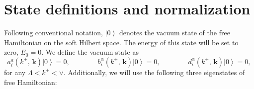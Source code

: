 \documentclass[10pt]{article}
\numberwithin{equation}{section}
\begin{document}
\section{State definitions and normalization}\label{sec:defn}
Following conventional notation, $\left|0\right\rangle$ denotes the vacuum state of the free Hamiltonian on the soft Hilbert space.
The energy of this state will be set to zero, $E_{0}=0$. 
We define the vacuum state as 
\begin{equation}
 a_{i}^{a}(k^{+},\, \mathbf{k})\left|0\right\rangle =0,\qquad\qquad b_{i}^{\alpha}(k^{+},\, \mathbf{k})\left|0\right\rangle =0,\qquad\qquad d_{i}^{\alpha}(k^{+},\, \mathbf{k})\left|0\right\rangle =0,
\end{equation}
for any $\Lambda<k^{+}<\vee$. 
Additionally, we will use the following three eigenstates of free Hamiltonian:\\
\end{document}
